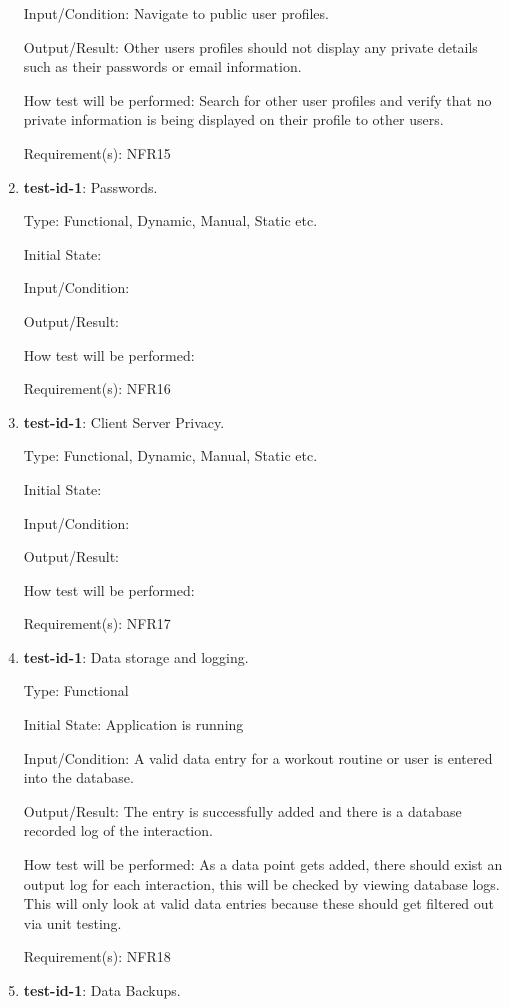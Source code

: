 \documentclass[12pt, titlepage]{article}
\begin{document}
\begin{enumerate}
		Input/Condition: Navigate to public user profiles.
		
		Output/Result: Other users profiles should not display any private details such as their passwords or email information. 
		
		How test will be performed: Search for other user profiles and verify that no private information is being displayed on their profile to other users.
		
		Requirement(s): NFR15
		
		\item{\textbf{test-id-1}}: Passwords.
		
		Type: Functional, Dynamic, Manual, Static etc.
		
		Initial State: 
		
		Input/Condition: 
		
		Output/Result: 
		
		How test will be performed: 
		
		Requirement(s): NFR16
		
		\item{\textbf{test-id-1}}: Client Server Privacy.
		
		Type: Functional, Dynamic, Manual, Static etc.
		
		Initial State: 
		
		Input/Condition: 
		
		Output/Result: 
		
		How test will be performed: 
		
		Requirement(s): NFR17
		
		\item{\textbf{test-id-1}}: Data storage and logging.
		
		Type: Functional
		
		Initial State: Application is running 
		
		Input/Condition: A valid data entry for a workout routine or user is entered into the database.
		
		Output/Result: The entry is successfully added and there is a database recorded log of the interaction.
		
		How test will be performed: As a data point gets added, there should exist an output log for each interaction, this will be checked by viewing database logs. This will only look at valid data entries because these should get filtered out via unit testing.
		
		Requirement(s): NFR18
		
		\item{\textbf{test-id-1}}: Data Backups.
		

\end{enumerate}
\end{document}
